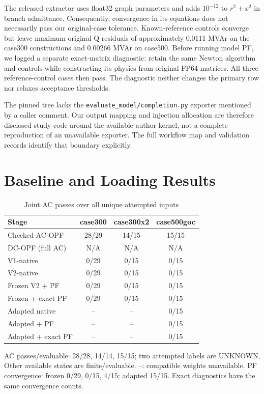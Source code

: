 \documentclass[conference,letterpaper]{IEEEtran}
\begin{document}
The released extractor uses float32 graph parameters and adds $10^{-12}$ to $r^2+x^2$ in branch admittance. Consequently, convergence in its equations does not necessarily pass our original-case tolerance. Known-reference controls converge but leave maximum original Q residuals of approximately 0.0111 MVAr on the case300 constructions and 0.00266 MVAr on case500. Before running model PF, we logged a separate exact-matrix diagnostic: retain the same Newton algorithm and controls while constructing its physics from original FP64 matrices. All three reference-control cases then pass. The diagnostic neither changes the primary row nor relaxes acceptance thresholds.

The pinned tree lacks the \texttt{evaluate\_model/completion.py} exporter mentioned by a caller comment. Our output mapping and injection allocation are therefore disclosed study code around the available author kernel, not a complete reproduction of an unavailable exporter. The full workflow map and validation records identify that boundary explicitly.

\section{Baseline and Loading Results}
\begin{table}[t]
\caption{Joint AC passes over all unique attempted inputs}
\label{tab:coverage}\centering\small
\begin{tabular}{lccc}\toprule
Stage & case300 & case300x2 & case500goc\\\midrule
Checked AC-OPF & 28/29 & 14/15 & 15/15\\
DC-OPF (full AC) & N/A & N/A & N/A\\
V1-native & 0/29 & 0/15 & 0/15\\
V2-native & 0/29 & 0/15 & 0/15\\
Frozen V2 + PF & 0/29 & 0/15 & 0/15\\
Frozen + exact PF & 0/29 & 0/15 & 0/15\\
Adapted native & -- & -- & 0/15\\
Adapted + PF & -- & -- & 0/15\\
Adapted + exact PF & -- & -- & 0/15\\\bottomrule
\end{tabular}
\par\smallskip\footnotesize AC passes/evaluable: 28/28, 14/14, 15/15; two attempted labels are UNKNOWN. Other available states are finite/evaluable. --: compatible weights unavailable. PF convergence: frozen 0/29, 0/15, 4/15; adapted 15/15. Exact diagnostics have the same convergence counts.
\end{table}
\end{document}
